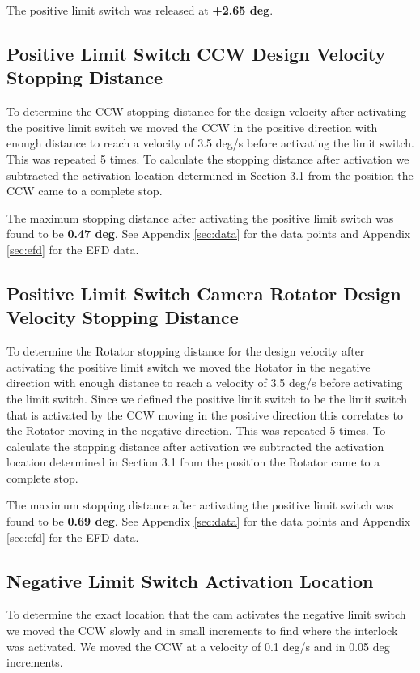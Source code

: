 \documentclass[SE,authoryear,toc]{lsstdoc}
\begin{document}
The positive limit switch was released at \textbf{+2.65 deg}.

\subsection{Positive Limit Switch CCW Design Velocity Stopping Distance}

To determine the CCW stopping distance for the design velocity after
activating the positive limit switch we moved the CCW in the positive
direction with enough distance to reach a velocity of 3.5 deg/s before
activating the limit switch. This was repeated 5 times. To
calculate the stopping distance after activation we subtracted the
activation location determined in Section 3.1 from the position the CCW
came to a complete stop.

The maximum stopping distance after activating the positive limit switch
was found to be \textbf{0.47 deg}. See Appendix \ref{sec:data} for the data points
and Appendix \ref{sec:efd} for the EFD data.

\subsection{Positive Limit Switch Camera Rotator Design Velocity Stopping Distance}

To determine the Rotator stopping distance for the design velocity after
activating the positive limit switch we moved the Rotator in the
negative direction with enough distance to reach a velocity of 3.5 deg/s
before activating the limit switch. Since we defined the positive limit
switch to be the limit switch that is activated by the CCW moving in the
positive direction this correlates to the Rotator moving in the negative
direction. This was repeated 5 times. To calculate the stopping
distance after activation we subtracted the activation location
determined in Section 3.1 from the position the Rotator came to a
complete stop.

The maximum stopping distance after activating the positive limit switch
was found to be \textbf{0.69 deg}. See Appendix \ref{sec:data} for the data points
and Appendix \ref{sec:efd} for the EFD data.

\subsection{Negative Limit Switch Activation Location}

To determine the exact location that the cam activates the negative
limit switch we moved the CCW slowly and in small increments to find
where the interlock was activated. We moved the CCW at a velocity of 0.1
deg/s and in 0.05 deg increments.
\end{document}
